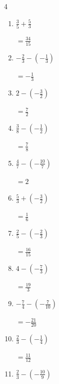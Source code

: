\newpage
\resetdrill

\begin{multicols}{4}
\begin{enumerate}
  \itemsep=18pt
  \item $\displaystyle \frac{3}{5} + \frac{5}{3}$

        $\displaystyle =\frac{34}{15}$

  \item $\displaystyle -\frac{2}{3} - \left(-\frac{1}{3}\right)$

        $\displaystyle =-\frac{1}{3}$

  \item $\displaystyle 2 - \left(-\frac{3}{2}\right)$

        $\displaystyle =\frac{7}{2}$

  \item $\displaystyle \frac{3}{8} - \left(-\frac{1}{2}\right)$

        $\displaystyle =\frac{7}{8}$

  \item $\displaystyle \frac{4}{7} - \left(-\frac{10}{7}\right)$

        $\displaystyle =2$

  \item $\displaystyle \frac{5}{3} + \left(-\frac{3}{2}\right)$

        $\displaystyle =\frac{1}{6}$

  \item $\displaystyle \frac{2}{5} - \left(-\frac{2}{3}\right)$

        $\displaystyle =\frac{16}{15}$

  \item $\displaystyle 4 - \left(-\frac{7}{3}\right)$

        $\displaystyle =\frac{19}{3}$

  \item $\displaystyle -\frac{7}{4} - \left(-\frac{7}{10}\right)$

        $\displaystyle =-\frac{21}{20}$

  \item $\displaystyle \frac{2}{3} - \left(-\frac{1}{4}\right)$

        $\displaystyle =\frac{11}{12}$

\columnbreak %

  \item $\displaystyle \frac{2}{3} - \left(-\frac{10}{9}\right)$


\end{enumerate}
\end{multicols}
